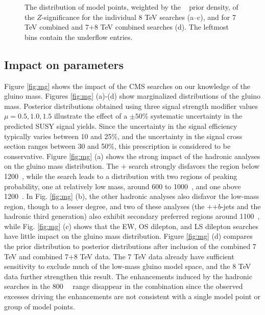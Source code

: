 \begin{figure}[t]
\centering
{}
\vspace{1mm}
\caption{The distribution of model points, weighted by the \preCMS~ prior density, of the $Z$-significance for the individual 8 TeV searches (a--c), and for 7 TeV combined and 7$+$8 TeV combined searches (d). The leftmost bins contain the underflow entries.}
\label{fig:Z}
\end{figure}
\FloatBarrier
\subsection{Impact on parameters}
Figure \ref{fig:mg} shows the impact of the CMS searches on our
knowledge of the gluino mass. Figures \ref{fig:mg} (a)-(d) show marginalized
distributions of the gluino mass.  Posterior distributions obtained
using three  signal strength modifier values $\mu = 0.5, 1.0, 1.5$
illustrate the effect of a $\pm50$\% systematic uncertainty in the
predicted SUSY signal yields.  Since the uncertainty in the signal efficiency typically varies between 10 and 25\%, and the uncertainty in the signal cross section ranges between 30 and 50\%, this prescription is considered to be conservative. Figure \ref{fig:mg} (a) shows the strong impact of
the hadronic analyses on the gluino mass distribution.  The
\HT{}$+$\MHT{} search strongly disfavors the region below 1200~\GeV,
while the \MTtwo{} search leads to a distribution with two regions of peaking probability, one at relatively low mass, around 600 to 1000~\GeV, and one
above 1200~\GeV.  In Fig. \ref{fig:mg} (b), the other hadronic
analyses also disfavor the low-mass region, though to a lesser degree,
 and two of these analyses (the \HT{}$+$\MET{}$+b$-jets and the
 hadronic third generation) also exhibit secondary
 preferred regions around 1100~\GeV, while Fig. \ref{fig:mg} (c) shows that the EW, OS dilepton, and LS dilepton searches have little impact on the gluino mass distribution.
Figure \ref{fig:mg} (d) compares the  prior distribution to posterior distributions after inclusion of the combined 7 TeV and combined 7$+$8 TeV data.  The 7 TeV data already have sufficient sensitivity to exclude much of the low-mass gluino model space, and the 8 TeV data further strengthen this result. The enhancements induced by the hadronic
searches in the 800~\GeV~ range disappear in the combination
since the observed excesses driving the enhancements are not
consistent with a single model point or group of model points.


